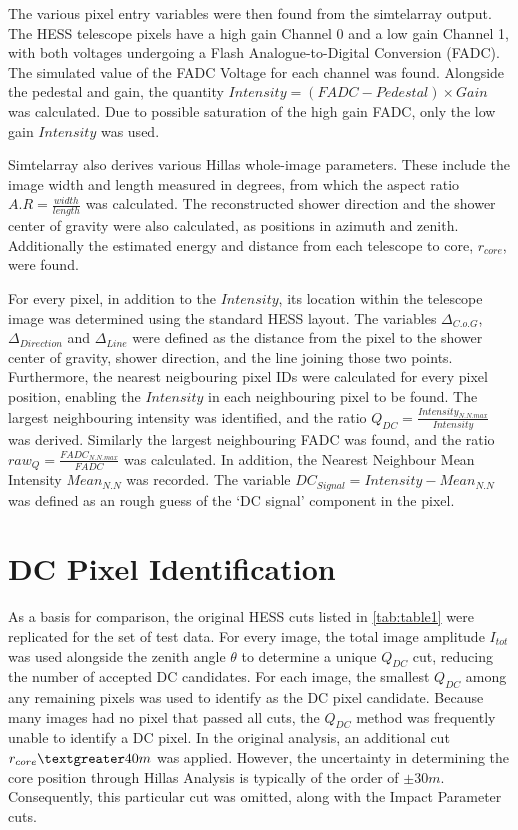 \documentclass[]{article}
\begin{document}
The various pixel entry variables were then found from the sim\textunderscore telarray output. The HESS telescope pixels have a high gain Channel 0 and a low gain Channel 1, with both voltages undergoing a Flash Analogue-to-Digital Conversion (FADC). The simulated value of the FADC Voltage for each channel was found. Alongside the pedestal and gain, the quantity $Intensity = (FADC - Pedestal)\times Gain $ was calculated. Due to possible saturation of the high gain FADC, only the low gain $Intensity$ was used.

Sim\textunderscore telarray also derives various Hillas whole-image parameters. These include the image width and length measured in degrees, from which the aspect ratio $A.R = \frac{width}{length}$ was calculated. The reconstructed shower direction and the shower center of gravity were also calculated, as positions in azimuth and zenith. Additionally the estimated energy and distance from each telescope to core, $r_{core}$,  were found.

For every pixel, in addition to the $Intensity$, its location within the telescope image was determined using the standard HESS layout. The variables $ \Delta_{C.o.G}$, $\Delta_{Direction}$ and $\Delta_{Line}$ were defined as the distance from the pixel to the shower center of gravity, shower direction, and the line joining those two points. Furthermore, the nearest neigbouring pixel IDs were calculated for every pixel position, enabling the $Intensity$ in each neighbouring pixel to be found. The largest neighbouring intensity was identified, and the ratio $Q_{DC} = \frac{Intensity_{N.N.max}}{Intensity}$ was derived. Similarly the largest neighbouring FADC was found, and the ratio $raw_{Q} = \frac{FADC_{N.N.max}}{FADC}$ was calculated. In addition, the Nearest Neighbour Mean Intensity $Mean_{N.N}$ was recorded. The variable $DC_{Signal} = Intensity-Mean_{N.N}$ was defined as an rough guess of the \textquoteleft DC signal' component in the pixel.

\section{DC Pixel Identification}  
As a basis for comparison, the original HESS cuts listed in \ref{tab:table1} were replicated for the set of test data.   For every image, the total image amplitude $I_{tot}$ was used alongside the zenith angle $\theta$ to determine a unique $Q_{DC}$ cut, reducing the number of accepted DC candidates. For each image, the smallest $Q_{DC}$ among any remaining pixels was used to identify as the DC pixel candidate. Because many images had no pixel that passed all cuts, the $Q_{DC}$ method was frequently unable to identify a DC pixel. In the original analysis, an additional cut $r_{core} \textgreater 40m$ was applied. However, the uncertainty in determining the core position through Hillas Analysis is typically of the order of $\pm 30m$. Consequently, this particular cut was omitted, along with the Impact Parameter cuts. 
\end{document}

